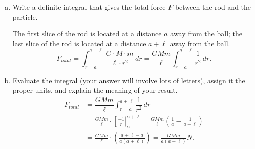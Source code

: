 \documentclass[12pt]{article}
\newenvironment{red}{\color{red}}{\ignorespacesafterend}
\begin{document}
\begin{enumerate}
\begin{enumerate}[(a)]
    \begin{red}
        We'll cut the rod into pieces of length $\Delta r$. Since the rod has uniform density (which is given by dividing the total mass of the rod by the total length of the rod, $\rho = \dfrac{M}{\ell}\si{kg/m}$), the mass of a small slice $\Delta M = \rho \cdot \Delta r = \dfrac{M\cdot \Delta r}{\ell}$. Therefore,
        \[\Delta F = \dfrac{G\cdot \Delta M \cdot m}{r^2} = \dfrac{1}{r^2} \cdot \left( G \cdot \left(\dfrac{M\cdot \Delta r}{\ell}\right)\cdot m \right)  = \dfrac{G\cdot M \cdot m}{\ell\cdot r^2} \Delta r.\]
    \end{red}

    \item Write a definite integral that gives the total force \(F\) between the rod and the particle.

    \begin{red}
        The first slice of the rod is located at a distance $a$ away from the ball; the last slice of the rod is located at a distance $a+\ell$ away from the ball.
        \[F_{total} = \int_{r=a}^{a+\ell}\, \dfrac{G\cdot M \cdot m}{\ell\cdot r^2}\, dr = \dfrac{GMm}{\ell} \int_{r=a}^{a+\ell} \dfrac1{r^2}\,dr.\]
    \end{red}
    \item Evaluate the integral (your answer will involve lots of letters), assign it the proper units, and explain the meaning of your result.
    \begin{red}
        \begin{align*}
            F_{total} &= \dfrac{GMm}{\ell} \int_{r=a}^{a+\ell} \dfrac1{r^2}\,dr \\
            &= \frac{GMm}{\ell}\cdot\left[\frac{-1}{r}\right|_a^{a+\ell} 
             = \frac{GMm}{\ell}\left(\frac{1}{a} - \frac{1}{a+\ell}\right) \\
            &= \frac{GMm}{\ell}\cdot\left(\frac{a+\ell-a}{a(a+\ell)}\right) 
             = \frac{GMm}{a(a+\ell)} \si{N}.
        \end{align*}
    \end{red}
\end{enumerate}

\end{enumerate}
\end{document}
